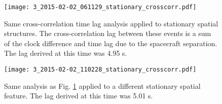 \begin{figure}
\noindent\texttt{[image: 3\_2015-02-02\_061129\_stationary\_crosscorr.pdf]}
\caption{Same cross-correlation time lag analysis applied to stationary spatial structures. The cross-correlation lag between these events is a sum of the clock difference and time lag due to the spacecraft separation. The lag derived at this time was 4.95 s.}
\label{figure_S5}
\end{figure}

\begin{figure}
\noindent\texttt{[image: 3\_2015-02-02\_110228\_stationary\_crosscorr.pdf]}
\caption{Same analysis as Fig. \ref{figure_S5} applied to a different stationary spatial feature. The lag derived at this time was 5.01 s.}
\label{figure_S6}
\end{figure}
